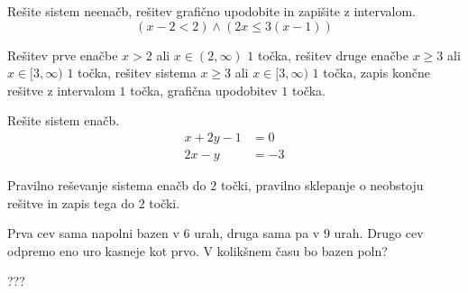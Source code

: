 \documentclass[addpoints]{exam}
\begin{document}
\begin{questions}
        

    \newpage
    \question[5]
    Rešite sistem neenačb, rešitev grafično upodobite in zapišite z intervalom.
    $$ \left(x-2<2\right)\land\left(2x\leq 3(x-1)\right) $$
    
    
    \begin{solution}[11cm]
        Rešitev prve enačbe $x>2$ ali $x\in(2,\infty)$ $1$ točka, rešitev druge enačbe $x\geq 3$ ali $x\in[3,\infty)$ $1$ točka, rešitev sistema $x\geq 3$ ali $x\in[3,\infty)$ $1$ točka, zapis končne rešitve z intervalom $1$ točka, grafična upodobitev $1$ točka.
    \end{solution}


    


    \question[4]
    Rešite sistem enačb.
    $$ \begin{aligned}
        x+2y-1&=0 \\ 2x-y&=-3
    \end{aligned} $$
    
    
    \begin{solution}[8cm]
        Pravilno reševanje sistema enačb do $2$ točki, pravilno sklepanje o neobstoju rešitve in zapis tega do $2$ točki.
    \end{solution}



    \question[4]
    Prva cev sama napolni bazen v $6$ urah, druga sama pa v $9$ urah. Drugo cev odpremo eno uro kasneje kot prvo.
    V kolikšnem času bo bazen poln?
    
    
    \begin{solution}[10cm]
        ???
    \end{solution}





    
    
    
    





\end{questions}
\end{document}
